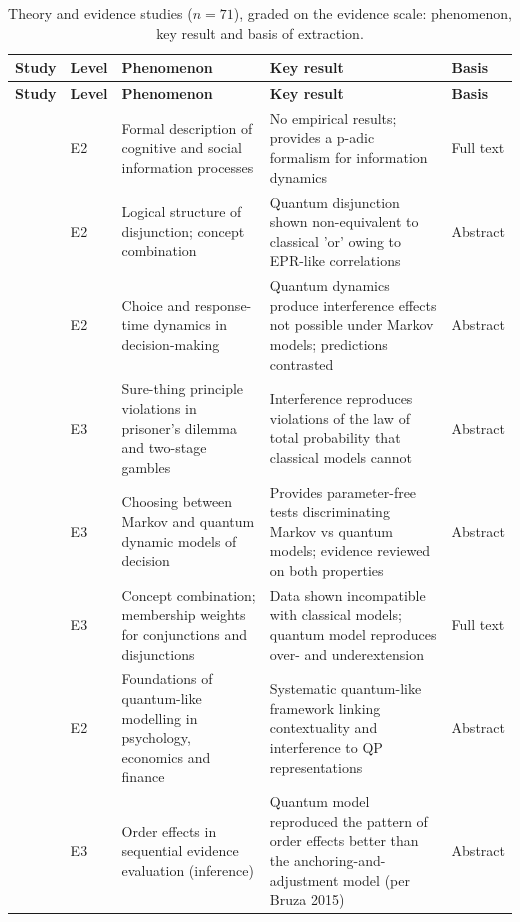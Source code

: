 \documentclass[10pt,a4paper]{article}
\begin{document}
\footnotesize
\begin{longtable}{@{}P{3.6cm}P{0.7cm}P{4.6cm}P{6.2cm}P{1.1cm}@{}}
\caption{Theory and evidence studies ($n = 71$), graded on the evidence scale: phenomenon, key result and basis of extraction.}\label{tab:S8}\\
\toprule \textbf{Study} & \textbf{Level} & \textbf{Phenomenon} & \textbf{Key result} & \textbf{Basis} \\ \midrule \endfirsthead
\toprule \textbf{Study} & \textbf{Level} & \textbf{Phenomenon} & \textbf{Key result} & \textbf{Basis} \\ \midrule \endhead
\bottomrule \endfoot

\citet{Khrennikov1999} & E2 & Formal description of cognitive and social information processes & No empirical results; provides a p-adic formalism for information dynamics & Full text \\
\citet{Aerts2000} & E2 & Logical structure of disjunction; concept combination & Quantum disjunction shown non-equivalent to classical 'or' owing to EPR-like correlations & Abstract \\
\citet{Busemeyer2006} & E2 & Choice and response-time dynamics in decision-making & Quantum dynamics produce interference effects not possible under Markov models; predictions contrasted & Abstract \\
\citet{Pothos2009} & E3 & Sure-thing principle violations in prisoner's dilemma and two-stage gambles & Interference reproduces violations of the law of total probability that classical models cannot & Abstract \\
\citet{Busemeyer2009} & E3 & Choosing between Markov and quantum dynamic models of decision & Provides parameter-free tests discriminating Markov vs quantum models; evidence reviewed on both properties & Abstract \\
\citet{Aerts2009} & E3 & Concept combination; membership weights for conjunctions and disjunctions & Data shown incompatible with classical models; quantum model reproduces over- and underextension & Full text \\
\citet{Khrennikov2010} & E2 & Foundations of quantum-like modelling in psychology, economics and finance & Systematic quantum-like framework linking contextuality and interference to QP representations & Abstract \\
\citet{Trueblood2011} & E3 & Order effects in sequential evidence evaluation (inference) & Quantum model reproduced the pattern of order effects better than the anchoring-and-adjustment model (per Bruza 2015) & Abstract \\

\end{longtable}
\end{document}
